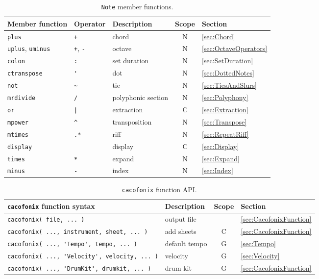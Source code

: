 \documentclass{article}
\newcommand{\note}{\lstinline!Note!\xspace}
\begin{document}
\begin{table}
  \centering
  \begin{tabular}{lllcl}
    Member function & Operator & Description & Scope & Section \\
    \hline
    \lstinline!plus! & \lstinline!+! & chord & N & \ref{sec:Chord} \\
    \lstinline!uplus!, \lstinline!uminus! & \lstinline!+!, \lstinline!-! & octave & N & \ref{sec:OctaveOperators} \\
    \lstinline!colon! & \lstinline!:! & set duration & N & \ref{sec:SetDuration} \\
    \lstinline!ctranspose! & \lstinline!'! & dot & N & \ref{sec:DottedNotes} \\
    \lstinline!not! & \lstinline!~! & tie & N & \ref{sec:TiesAndSlurs} \\
    \lstinline!mrdivide! & \lstinline!/! & polyphonic section & N & \ref{sec:Polyphony} \\
    \lstinline!or! & \lstinline!|! & extraction & C & \ref{sec:Extraction} \\
    \lstinline!mpower! & \lstinline!^! & transposition & N & \ref{sec:Transpose} \\
    \lstinline!mtimes! & \lstinline!.*! & riff & N & \ref{sec:RepeatRiff} \\
    \lstinline!display!& & display & C & \ref{sec:Display} \\
    \lstinline!times! & \lstinline!*! & expand & N & \ref{sec:Expand} \\
    \lstinline!minus! & \lstinline!-! & index & N & \ref{sec:Index} \\
  \end{tabular}
  \caption[\note member functions]{\note member functions.}
  \label{tab:NoteFunctions}
\end{table}

\begin{table}
  \centering
  \begin{tabular}{llcl}
    \lstinline!cacofonix! function syntax & Description & Scope & Section \\
    \hline
    \lstinline!cacofonix( file, ... )! & output file & & \ref{sec:CacofonixFunction} \\
    \lstinline!cacofonix( ..., instrument, sheet, ... )! & add sheets & C & \ref{sec:CacofonixFunction} \\
    \lstinline!cacofonix( ..., 'Tempo', tempo, ... )! & default tempo & G & \ref{sec:Tempo} \\
    \lstinline!cacofonix( ..., 'Velocity', velocity, ... )! & velocity & G & \ref{sec:Velocity} \\
    \lstinline!cacofonix( ..., 'DrumKit', drumkit, ... )! & drum kit & G & \ref{sec:CacofonixFunction} \\
  \end{tabular}
  \caption[\lstinline!cacofonix! function API]{\lstinline!cacofonix! function API.}
  \label{tab:CacofonixAPI}
\end{table}
\end{document}
